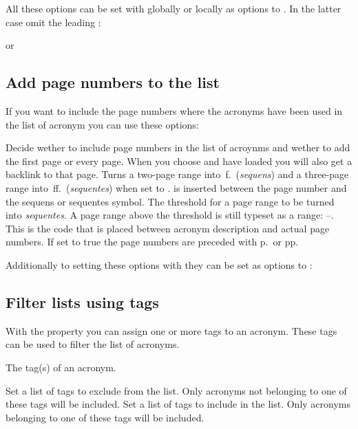 \documentclass{acro-manual}
\newcommand*\latin[1]{\textit{#1}}
\begin{document}
All these options can be set with  globally or locally as options
to . In the latter case omit the leading
:
\begin{sourcecode}
  or
  \printacronyms[display=all,exclude=units]
\end{sourcecode}

\subsection{Add page numbers to the list}\label{sec:page-numbers}
If you want to include the page numbers where the acronyms have been used in
the list of acronym you can use these options:
\begin{options}
    Decide wether to include page numbers in the list of acroynms and wether
    to add the first page or every page.  When you choose  and
    have  loaded you will also get a backlink to that page.
    Turns a two-page range into \,f.\ (\latin{sequens}) and a
    three-page range into \,ff.\ (\latin{sequentes}) when set to
    .
  \Default{\cs*{,}}
     is inserted between the page number and the sequens or
    sequentes symbol.
    The threshold for a page range to be turned into \latin{sequentes}.  A
    page range above the threshold is still typeset as a range:
    --.
    This is the code that is placed between acronym description and actual
    page numbers.
    If set to true the page numbers are preceded with p.\ or pp.
\end{options}
Additionally to setting these options with  they
can be set as options to :
\begin{sourcecode}
  \printacronyms[pages={display=all,seq/use=false}]
\end{sourcecode}

\subsection{Filter lists using tags}\label{sec:lists-tags}
With the property  you can assign one or more tags to an
acronym.  These tags can be used to filter the list of acronyms.
\begin{properties}
  \Default
    The tag(s) of an acronym.
\end{properties}
\begin{options}
  \Default
    Set a list of tags to exclude from the list.  Only acronyms not
    belonging to one of these tags will be included.
  \Default
    Set a list of tags to include in  the list.  Only acronyms belonging to
    one of these tags will be included.
\end{options}
  
\end{document}
